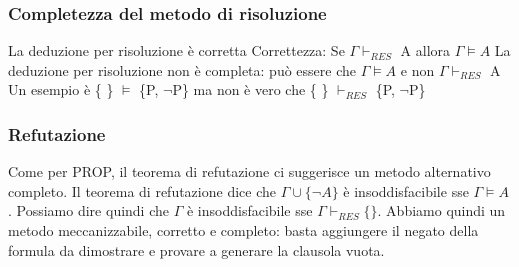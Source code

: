 \documentclass{article}
\begin{document}
\subsubsection{Completezza del metodo di risoluzione}
La deduzione per risoluzione è corretta	Correttezza: Se $\Gamma \vdash _{RES}$ A allora $\Gamma \models A$ \newline
La deduzione per risoluzione non è completa: può essere che $\Gamma \models A$ e non $\Gamma \vdash _{RES}$ A \newline
Un esempio è \{ \} $\models$ \{P, $\neg$P\} ma non è vero che \{ \} $\vdash _{RES}$ \{P, $\neg$P\} 
\subsubsection{Refutazione}
Come per PROP, il teorema di refutazione ci suggerisce un metodo alternativo completo. 
Il teorema di refutazione dice che $\Gamma \cup \{\neg A\}$ è insoddisfacibile sse $\Gamma \models A$. \newline
Possiamo dire quindi che $\Gamma$ è insoddisfacibile sse $\Gamma \vdash _{RES} \{\}$. Abbiamo quindi un metodo meccanizzabile, corretto e completo: basta aggiungere il negato della formula da dimostrare e provare a generare la clausola vuota.
\end{document}

